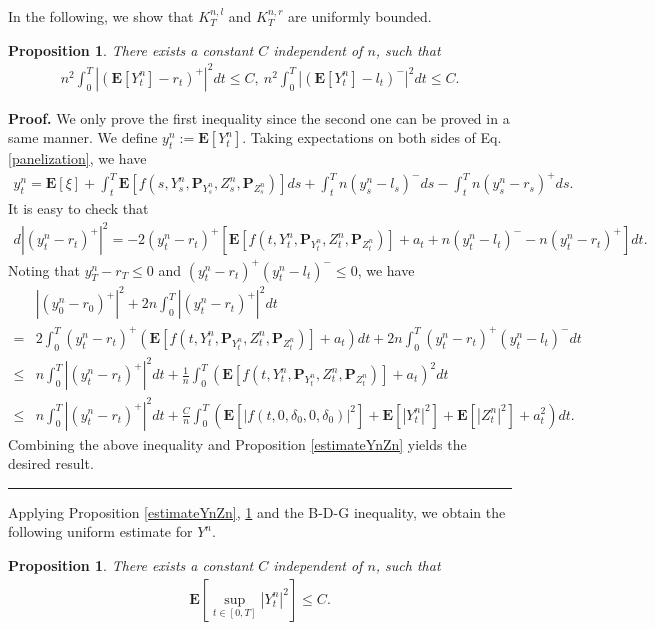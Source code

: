 \documentclass[10pt]{article}%
\numberwithin{equation}{section}
\newtheorem{proposition}[theorem]{Proposition}
\newenvironment{proof}[1][Proof]{\noindent \textbf{#1.} }{\  \rule{0.5em}{0.5em}}
\def \E{\mathbf{E}}
\def \P{\mathbf{P}}
\begin{document}
In the following, we show that $K^{n,l}_T$ and $K^{n,r}_T$ are uniformly bounded.
\begin{proposition}\label{estimateYn-r}
There exists a constant $C$ independent of $n$, such that
\begin{align*}
n^2\int_0^T\left|(\E[Y_t^n]-r_t)^+\right|^2 dt\leq {C},\
n^2\int_0^T\left|(\E[Y_t^n]-l_t)^-\right|^2 dt\leq {C}.
\end{align*}
\end{proposition}

\begin{proof}
We only prove the first inequality since the second one can be proved in a same manner. We define $y^n_t:=\E[Y^n_t]$. Taking expectations on both sides of Eq. \eqref{panelization}, we have
\begin{align*}
y_t^n=\E[\xi]+\int_t^T \E\left[f\left(s,Y^n_s,\P_{Y^n_s},Z^n_s,\P_{Z^n_s}\right)\right]ds+\int_t^T n(y^n_s-l_s)^- ds-\int_t^T n(y^n_s-r_s)^+ds.
\end{align*} 
It is easy to check that 
\begin{align*}
d\left|(y^n_t-r_t)^+\right|^2=-2(y^n_t-r_t)^+ \left[ \E\left[f(t,Y^n_t,\P_{Y^n_t},Z^n_t,\P_{Z^n_t})\right]+a_t+n(y^n_t-l_t)^- -n(y^n_t-r_t)^+\right]dt.
\end{align*}
Noting that $y^n_T-r_T\leq 0$ and $(y^n_t-r_t)^+(y^n_t-l_t)^-\leq 0$, we have
\begin{align*}
&|(y^n_0-r_0)^+|^2+2n\int_0^T |(y^n_t-r_t)^+|^2dt\\
=&2\int_0^T (y^n_t-r_t)^+\left(\E\left[f(t,Y^n_t,\P_{Y^n_t},Z^n_t,\P_{Z^n_t})\right]+a_t\right) dt+2n\int_0^T (y^n_t-r_t)^+(y^n_t-l_t)^-dt\\
\leq &n\int_0^T  \left|(y^n_t-r_t)^+\right|^2dt+\frac{1}{n}\int_0^T \left(\E[f(t,Y^n_t,\P_{Y^n_t},Z^n_t,\P_{Z^n_t})]+a_t\right) ^2dt\\
\leq &n\int_0^T  \left|(y^n_t-r_t)^+\right|^2dt+\frac{C}{n}\int_0^T \left(\E[\left|f(t,0,\delta_0,0,\delta_0)\right|^2]+\E[\left|Y_t^n\right|^2]+\E[\left|Z_t^n\right|^2]+a^2_t\right)dt.
\end{align*}
Combining the above inequality and Proposition \ref{estimateYnZn} yields the desired result.
\end{proof}

Applying Proposition \ref{estimateYnZn}, \ref{estimateYn-r} and the B-D-G inequality, we obtain the following uniform estimate for $Y^n$.
\begin{proposition}\label{estimateKn}
There exists a constant $C$ independent of $n$, such that
\begin{align*}
\E\left[\sup_{t\in[0,T]}\left|Y_t^n\right|^2\right]\leq C.
\end{align*}
\end{proposition}
\end{document}
